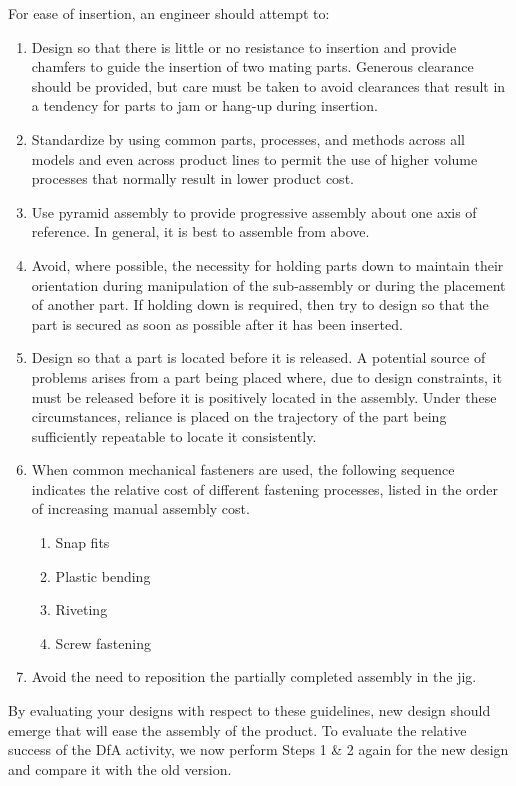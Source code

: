  For ease of insertion, an engineer should attempt to:

\begin{enumerate}
  \item Design so that there is little or no resistance to insertion and provide chamfers to guide the insertion of two mating parts. Generous clearance should be provided, but care must be taken to avoid clearances that result in a tendency for parts to jam or hang-up during insertion.
  \item Standardize by using common parts, processes, and methods across all models and even across product lines to permit the use of higher volume processes that normally result in lower product cost.
  \item Use pyramid assembly to provide progressive assembly about one axis of reference. In general, it is best to assemble from above.
  \item Avoid, where possible, the necessity for holding parts down to maintain their orientation during manipulation of the sub-assembly or during the placement of another part. If holding down is required, then try to design so that the part is secured as soon as possible after it has been inserted.
  \item Design so that a part is located before it is released. A potential source of problems arises from a part being placed where, due to design constraints, it must be released before it is positively located in the assembly. Under these circumstances, reliance is placed on the trajectory of the part being sufficiently repeatable to locate it consistently.
  \item When common mechanical fasteners are used, the following sequence indicates the relative cost of different fastening processes, listed in the order of increasing manual assembly cost.
  \begin{enumerate}
    \item Snap fits
    \item Plastic bending
    \item Riveting
    \item Screw fastening
  \end{enumerate}
  \item Avoid the need to reposition the partially completed assembly in the jig.
\end{enumerate}

By evaluating your designs with respect to these guidelines, new design should emerge that will ease the assembly of the product. To evaluate the relative success of the DfA activity, we now perform Steps 1 \& 2 again for the new design and compare it with the old version.

